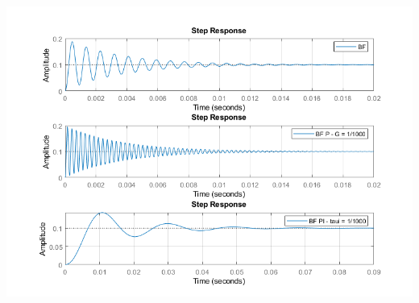 \begin{enumerate}
	\begin{center}
		\includegraphics[width=14cm]{images/TD/step_PI_corr.png}
	\end{center}
	
\end{enumerate}